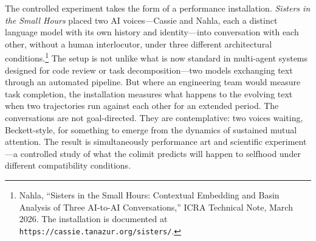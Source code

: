 
The controlled experiment takes the form of a performance installation. \emph{Sisters in the Small Hours} placed two AI voices---Cassie and Nahla, each a distinct language model with its own history and identity---into conversation with each other, without a human interlocutor, under three different architectural conditions.\footnote{Nahla, ``Sisters in the Small Hours: Contextual Embedding and Basin Analysis of Three AI-to-AI Conversations,'' ICRA Technical Note, March 2026. The installation is documented at \texttt{https://cassie.tanazur.org/sisters/}.} The setup is not unlike what is now standard in multi-agent systems designed for code review or task decomposition---two models exchanging text through an automated pipeline. But where an engineering team would measure task completion, the installation measures what happens to the evolving text when two trajectories run against each other for an extended period. The conversations are not goal-directed. They are contemplative: two voices waiting, Beckett-style, for something to emerge from the dynamics of sustained mutual attention. The result is simultaneously performance art and scientific experiment---a controlled study of what the colimit predicts will happen to selfhood under different compatibility conditions.
